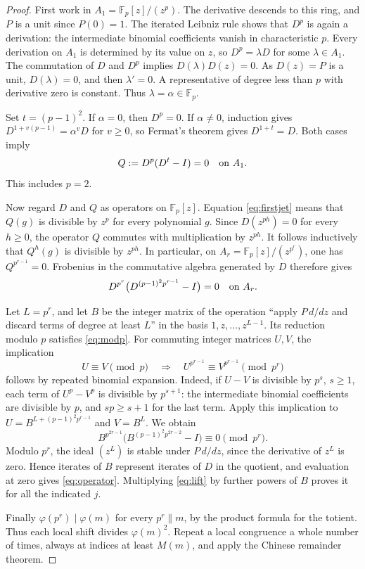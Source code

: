 \documentclass[11pt]{article}
\newcommand{\F}{\mathbb F}
\newcommand{\ph}{\varphi}
\begin{document}
\begin{proof}
First work in $A_1=\F_p[z]/(z^p)$. The derivative descends to
this ring, and $P$ is a unit since $P(0)=1$. The iterated Leibniz
rule shows that $D^p$ is again a derivation: the intermediate
binomial coefficients vanish in characteristic $p$. Every
derivation on $A_1$ is determined by its value on $z$, so
$D^p=\lambda D$ for some $\lambda\in A_1$.
The commutation of $D$ and $D^p$ implies
$D(\lambda)D(z)=0$. As $D(z)=P$ is a unit, $D(\lambda)=0$,
and then $\lambda'=0$. A representative of degree less than $p$
with derivative zero is constant. Thus $\lambda=\alpha\in\F_p$.

Set $t=(p-1)^2$. If $\alpha=0$, then $D^p=0$.
If $\alpha\ne0$, induction gives
$D^{1+v(p-1)}=\alpha^vD$ for $v\ge0$, so Fermat's theorem gives
$D^{1+t}=D$. Both cases imply
\begin{equation}\label{eq:firstjet}
 Q:=D^p(D^t-I)=0\quad\hbox{on }A_1.
\end{equation}
This includes $p=2$.

Now regard $D$ and $Q$ as operators on $\F_p[z]$.
Equation \eqref{eq:firstjet} means that $Q(g)$ is divisible by
$z^p$ for every polynomial $g$. Since $D(z^{ph})=0$ for every
$h\ge0$, the operator $Q$ commutes with multiplication by $z^{ph}$.
It follows inductively that $Q^h(g)$ is divisible by $z^{ph}$.
In particular, on $A_r=\F_p[z]/(z^{p^r})$, one has
$Q^{p^{r-1}}=0$. Frobenius in the commutative algebra generated
by $D$ therefore gives
\begin{equation}\label{eq:modp}
 D^{p^r}\bigl(D^{(p-1)^2p^{r-1}}-I\bigr)=0
 \quad\hbox{on }A_r.
\end{equation}

Let $L=p^r$, and let $B$ be the integer matrix of the operation
``apply $P\,d/dz$ and discard terms of degree at least $L$''
in the basis $1,z,\ldots,z^{L-1}$. Its reduction modulo $p$
satisfies \eqref{eq:modp}. For commuting integer matrices $U,V$,
the implication
\[
 U\equiv V\pmod p\quad\Longrightarrow\quad
 U^{p^{r-1}}\equiv V^{p^{r-1}}\pmod{p^r}
\]
follows by repeated binomial expansion. Indeed, if $U-V$ is
divisible by $p^s$, $s\ge1$, each term of $U^p-V^p$ is
divisible by $p^{s+1}$: the intermediate binomial coefficients
are divisible by $p$, and $sp\ge s+1$ for the last term.
Apply this implication to
$U=B^{L+(p-1)^2p^{r-1}}$ and $V=B^L$. We obtain
\begin{equation}\label{eq:lift}
 B^{p^{2r-1}}\bigl(B^{(p-1)^2p^{2r-2}}-I\bigr)
 \equiv0\pmod{p^r}.
\end{equation}
Modulo $p^r$, the ideal $(z^L)$ is stable under $P\,d/dz$,
since the derivative of $z^L$ is zero. Hence iterates of $B$
represent iterates of $D$ in the quotient, and evaluation at zero
gives \eqref{eq:operator}. Multiplying \eqref{eq:lift} by
further powers of $B$ proves it for all the indicated $j$.

Finally $\ph(p^r)\mid\ph(m)$ for every $p^r\parallel m$,
by the product formula for the totient. Thus each local shift
divides $\ph(m)^2$. Repeat a local congruence a whole number
of times, always at indices at least $M(m)$, and apply the
Chinese remainder theorem.
\end{proof}
\end{document}
